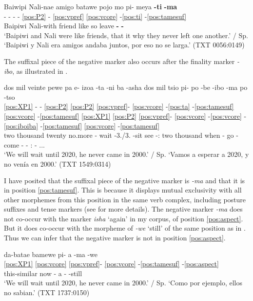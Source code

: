 \documentclass[output=paper,hidelinks]{langscibook}
\begin{document}
\ea \label{ex:pimeyatima}
    \glll Baiwipi Nali-nae amigo batawe pojo mo pi- meya \textbf{-ti} \textbf{-ma} \\
     - - - - \ref{pos:P2} - \ref{pos:vpref} \ref{pos:vcore} -\ref{pos:ti} -\ref{pos:tamesuf}  \\
     Baipiwi Nali-with friend like so \Foc{} \Neg{} leave \textbf{-\Intrc{}} \textbf{-\Neg{}} \\
    \glt `Baipiwi and Nali were like friends, that it why they never left one another.' / Sp. `Baipiwi y Nali era amigos andaba juntos, por eso no se larga.'  \hfill (TXT 0056:0149)
\z 

The suffixal piece of the negative marker also occurs after the finality marker \textit{-ibo}, as illustrated in .

\ea \label{ex:pipobeiboma}
    \glll dos mil veinte pewe pa e- izoa -ta -ni ba -asha dos mil tsio pi- po -be -ibo -ma po -tso	 \\
    \ref{pos:XP1} - - \ref{pos:P2} \ref{pos:P2} \ref{pos:vpref}- \ref{pos:vcore} -\ref{pos:ta} -\ref{pos:tamesuf} \ref{pos:vcore} -\ref{pos:tamesuf} \ref{pos:XP1} \ref{pos:P2} \ref{pos:vpref}- \ref{pos:vcore} -\ref{pos:vcore} -\ref{pos:iboiba} -\ref{pos:tamesuf} \ref{pos:vcore} -\ref{pos:tamesuf}
      \\
      two thousand twenty no.more \Rep{} \E{}- wait -3.\Aarg{}/3.\Pl{} -sit see -\Dist{}:\Pst{} two thousand when \Neg{}- go -come -\Final{} -\Neg{} \Aux{}:\Intr{} -\Prior{} ...  \\
    \glt `We will wait until 2020, he never came in 2000.' / Sp. `Vamos a esperar a 2020, y no venía en 2000.'  \hfill (TXT 1549:0314)
\z 

I have posited that the suffixal piece of the negative marker is \textit{-ma} and that it is in position \ref{pos:tamesuf}. This is because it displays mutual exclusivity with all other morphemes from this position in the same verb complex, including posture suffixes and tense markers (see  for more details). The negative marker \textit{-ma} does not co-occur with the marker \textit{isha} `again' in my corpus, of position \ref{pos:aspect}. But it does co-occur with the morpheme of \textit{-we} `still' of the same position as in . Thus we can infer that the negative marker is not in position \ref{pos:aspect}.

\ea \label{ex:piamawe}{
    \glll da-batae bamewe pi- a -ma -we \\
     \ref{pos:XP1} \ref{pos:vcore} \ref{pos:vpref}- \ref{pos:vcore} -\ref{pos:tamesuf} -\ref{pos:aspect} \\
     this-similar now \Neg{}- a -\Neg{} -still \\
    \glt `We will wait until 2020, he never came in 2000.' / Sp. `Como por ejemplo, ellos no sabian.'  \hfill (TXT 1737:0150)}
\z 
\end{document}
